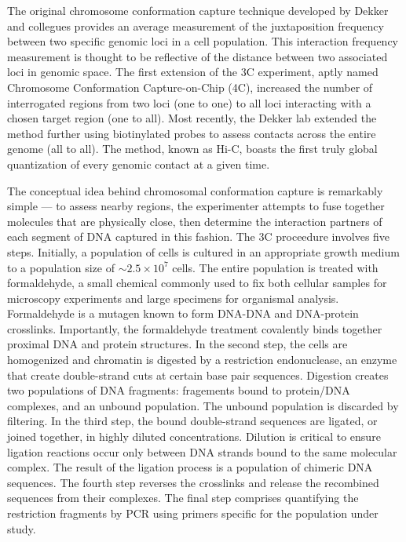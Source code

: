\documentclass[phd,tocprelim]{cornell}
\begin{document}
The original chromosome conformation capture technique developed by Dekker and
collegues provides an average measurement of the juxtaposition frequency between
two specific genomic loci in a cell population\cite{frase2014}.  This
interaction frequency measurement is thought to be reflective of the distance
between two associated loci in genomic space.  The first extension of the 3C
experiment, aptly named Chromosome Conformation Capture-on-Chip (4C), increased
the number of interrogated regions from two loci (one to one) to all loci
interacting with a chosen target region (one to all)\cite{simonis2006}.  Most
recently, the Dekker lab extended the method further using biotinylated probes
to assess contacts across the entire genome (all to all)\cite{berkum2010}.
The method, known as Hi-C, boasts the first truly global quantization of every
genomic contact at a given time.

The conceptual idea behind chromosomal conformation capture is remarkably
simple --- to assess nearby regions, the experimenter attempts to fuse
together molecules that are physically close, then determine the interaction
partners of each segment of DNA captured in this fashion.  The 3C proceedure
involves five steps.   Initially, a population of cells is cultured in an appropriate
growth medium to a population size of $\sim2.5 \times 10^7$ cells\cite{berkum2010}.
The entire population is treated with formaldehyde, a small chemical commonly
used to fix both cellular samples for microscopy experiments and large specimens
for organismal analysis.  Formaldehyde is a mutagen known to form DNA-DNA and
DNA-protein crosslinks\cite{merk1998}.  Importantly, the formaldehyde
treatment covalently binds together proximal DNA and protein structures.
In the second step, the cells are homogenized and chromatin is digested by a
restriction endonuclease, an enzyme that create double-strand cuts at certain
base pair sequences\cite{berkum2010}.  Digestion creates two populations of
DNA fragments: fragements bound to protein/DNA complexes, and an unbound
population.  The unbound population is discarded by filtering.  In the
third step, the bound double-strand sequences are ligated, or joined together,
in highly diluted concentrations. Dilution is critical to ensure ligation
reactions occur only between DNA strands bound to the same molecular complex.
The result of the ligation process is a population of chimeric DNA sequences.
The fourth step reverses the crosslinks and release the recombined sequences
from their complexes.  The final step comprises quantifying the restriction
fragments by PCR using primers specific for the population under
study\cite{simonis2007}.
\end{document}

